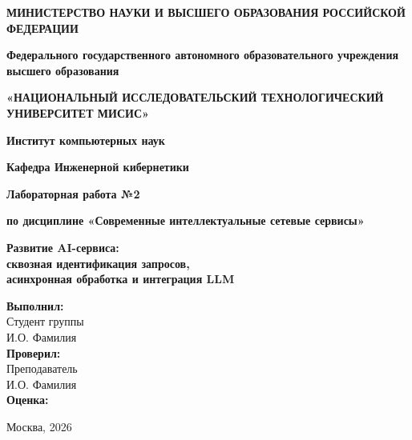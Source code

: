 \documentclass[12pt,a4paper]{article}
\begin{document}
\begin{titlepage}
    \begin{center}
        \textbf{МИНИСТЕРСТВО НАУКИ И ВЫСШЕГО ОБРАЗОВАНИЯ РОССИЙСКОЙ ФЕДЕРАЦИИ}
        \vspace{0.5cm}

        \textbf{Федерального государственного автономного образовательного учреждения \\ высшего образования}
        \vspace{0.3cm}

        \textbf{«НАЦИОНАЛЬНЫЙ ИССЛЕДОВАТЕЛЬСКИЙ ТЕХНОЛОГИЧЕСКИЙ УНИВЕРСИТЕТ МИСИС»}
        \vspace{2cm}


        \textbf{Институт компьютерных наук}
        \vspace{0.3cm}

        \textbf{Кафедра Инженерной кибернетики}
        \vspace{1cm}

        \textbf{Лабораторная работа №2}
        \vspace{0.3cm}

        \textbf{по дисциплине «Современные интеллектуальные сетевые сервисы»}
        \vspace{1.5cm}

        \huge{\textbf{Развитие AI-сервиса: \\ сквозная идентификация запросов, \\ асинхронная обработка и интеграция LLM}}
        \vspace{2cm}
    \end{center}

    \begin{flushright}
        \textbf{Выполнил:} \\
        Студент группы \\
        И.О. Фамилия \\
        \vspace{0.5cm}
        \textbf{Проверил:} \\
        Преподаватель \\
        И.О. Фамилия \\
        \vspace{2cm}
        \textbf{Оценка:} \hrulefill
    \end{flushright}

    \begin{center}
        \vfill
        Москва, 2026
    \end{center}
\end{titlepage}
\end{document}
